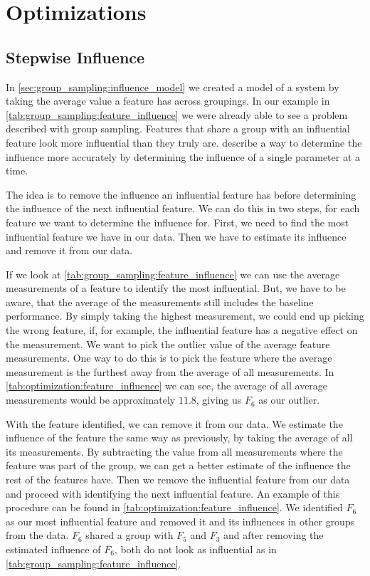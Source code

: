 \documentclass[../../thesis.tex]{subfiles}
\begin{document}
\section{Optimizations}

\subsection{Stepwise Influence}\label{sec:optimization:stepwise_influence}

In \autoref{sec:group_sampling:influence_model} we created a model of a system by
taking the average value a feature has across groupings. In our example in \autoref{tab:group_sampling:feature_influence}
we were already able to see a problem \citet{saltelli2008global} described with group sampling. Features that
share a group with an influential feature look more influential than they truly are. 
describe a way to determine the influence more accurately by determining the influence of a single parameter at a time.

The idea is to remove the influence an influential feature has before determining the influence of the next influential feature.
We can do this in two steps, for each feature we want to determine the influence for. First, we need to find the most influential
feature we have in our data. Then we have to estimate its influence and remove it from our data.

If we look at \autoref{tab:group_sampling:feature_influence} we can use the average measurements of a feature to identify the
most influential. But, we have to be aware, that the average of the measurements still includes the baseline performance.
By simply taking the highest measurement, we could end up picking the wrong feature, if, for example, the influential feature has
a negative effect on the measurement. We want to pick the outlier value of the average feature measurements.
One way to do this is to pick the feature where the average measurement is the furthest away from the average of all measurements.
In \autoref{tab:optimization:feature_influence} we can see, the average of all average measurements would be approximately $11.8$,
giving us $F_6$ as our outlier.

With the feature identified, we can remove it from our data. We estimate the influence of the feature the same way as previously, by taking
the average of all its measurements. By subtracting the value from all measurements where the feature was part of the group, we can get
a better estimate of the influence the rest of the features have. Then we remove the influential feature from our data
and proceed with identifying the next influential feature.
An example of this procedure can be found in \autoref{tab:optimization:feature_influence}.
We identified $F_6$ as our most influential feature and removed it and its influences in other groups from the data.
$F_6$ shared a group with $F_5$ and $F_3$ and after removing the estimated influence of $F_6$,
both do not look as influential as in \autoref{tab:group_sampling:feature_influence}.
\end{document}
